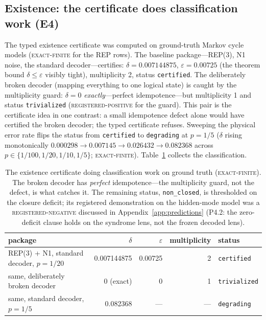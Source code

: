 \documentclass[11pt]{article}
\newcommand{\grade}[1]{\textsc{#1}}
\newcommand{\gExact}{\grade{exact-finite}}
\newcommand{\gRegPos}{\grade{registered-positive}}
\newcommand{\gRegNeg}{\grade{registered-negative}}
\theoremstyle{definition}
\begin{document}
\subsection{Existence: the certificate does classification work (E4)}
\label{sec:results-existence}

The typed existence certificate was computed on ground-truth Markov cycle models (\gExact{} for the REP rows). The baseline package---REP(3), N1 noise, the standard decoder---certifies: $\delta = 0.007144875$, $\varepsilon = 0.00725$ (the theorem bound $\delta \le \varepsilon$ visibly tight), multiplicity 2, status \texttt{certified}. The deliberately broken decoder (mapping everything to one logical state) is caught by the multiplicity guard: $\delta = 0$ \emph{exactly}---perfect idempotence---but multiplicity 1 and status \texttt{trivialized} (\gRegPos{} for the guard). This pair is the certificate idea in one contrast: a small idempotence defect alone would have certified the broken decoder; the typed certificate refuses. Sweeping the physical error rate flips the status from \texttt{certified} to \texttt{degrading} at $p = 1/5$ ($\delta$ rising monotonically $0.000298 \to 0.007145 \to 0.026432 \to 0.082368$ across $p \in \{1/100, 1/20, 1/10, 1/5\}$; \gExact). Table~\ref{tab:certificate} collects the classification.

\begin{table}[htbp]
\centering\small
\begin{tabular}{l r r r l}
\toprule
package & $\delta$ & $\varepsilon$ & multiplicity & status \\
\midrule
REP(3) + N1, standard decoder, $p = 1/20$ & 0.007144875 & 0.00725 & 2 & \texttt{certified} \\ same, deliberately broken decoder & 0 (exact) & 0 & 1 & \texttt{trivialized} \\ same, standard decoder, $p = 1/5$ & 0.082368 & --- & --- & \texttt{degrading} \\ \bottomrule
\end{tabular}
\caption{The existence certificate doing classification work on ground truth (\gExact). The broken decoder has \emph{perfect} idempotence---the multiplicity guard, not the defect, is what catches it. The remaining status, \texttt{non\_closed}, is thresholded on the closure deficit; its registered demonstration on the hidden-mode model was a \gRegNeg{} discussed in Appendix~\ref{app:predictions} (P4.2: the zero-deficit clause holds on the syndrome lens, not the frozen decoded lens).} \label{tab:certificate}
\end{table}
\end{document}
